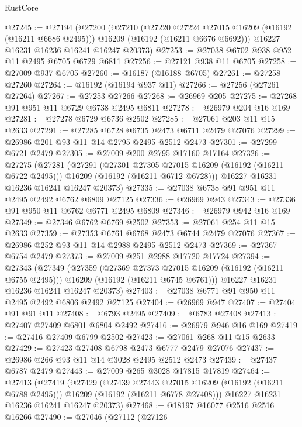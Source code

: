 \begin{lexlean}{RustCore}
\begin{coremodule}
@27245 := @27194
    (@27200
      (@27210
        (@27220 @27224 @27015 @16209 (@16192 (@16211 @6686 @2495)))
        @16209
        (@16192 (@16211 @6676 @6692)))
      @16227
      @16231
      @16236
      @16241
      @16247
      @20373)
@27253 := @27038 @6702 @938 @952 @11 @2495 @6705 @6729 @6811
@27256 := @27121 @938 @11 @6705
@27258 := @27009 @937 @6705
@27260 := @16187 (@16188 @6705)
@27261 := @27258 @27260
@27264 := @16192 (@16194 @937 @11)
@27266 := @27256 (@27261 @27264)
@27267 := @27253 @27266
@27268 := @26969 @205
@27275 := @27268 @91 @951 @11 @6729 @6738 @2495 @6811
@27278 := @26979 @204 @16 @169
@27281 := @27278 @6729 @6736 @2502
@27285 := @27061 @203 @11 @15 @2633
@27291 := @27285 @6728 @6735 @2473 @6711 @2479 @27076
@27299 := @26986 @201 @93 @11 @14 @2795 @2495 @2512 @2473
@27301 := @27299 @6721 @2479
@27305 := @27009 @200 @2795 @17160 @17164
@27326 := @27275
    (@27281
      (@27291
        (@27301 @27305 @27015 @16209 (@16192 (@16211 @6722 @2495)))
        @16209
        (@16192 (@16211 @6712 @6728)))
      @16227
      @16231
      @16236
      @16241
      @16247
      @20373)
@27335 := @27038 @6738 @91 @951 @11 @2495 @2492 @6762 @6809 @27125
@27336 := @26969 @943
@27343 := @27336 @91 @950 @11 @6762 @6771 @2495 @6809
@27346 := @26979 @942 @16 @169
@27349 := @27346 @6762 @6769 @2502
@27353 := @27061 @254 @11 @15 @2633
@27359 := @27353 @6761 @6768 @2473 @6744 @2479 @27076
@27367 := @26986 @252 @93 @11 @14 @2988 @2495 @2512 @2473
@27369 := @27367 @6754 @2479
@27373 := @27009 @251 @2988 @17720 @17724
@27394 := @27343
    (@27349
      (@27359
        (@27369 @27373 @27015 @16209 (@16192 (@16211 @6755 @2495)))
        @16209
        (@16192 (@16211 @6745 @6761)))
      @16227
      @16231
      @16236
      @16241
      @16247
      @20373)
@27403 := @27038 @6771 @91 @950 @11 @2495 @2492 @6806 @2492 @27125
@27404 := @26969 @947
@27407 := @27404 @91 @91 @11
@27408 := @6793 @2495
@27409 := @6783 @27408
@27413 := @27407 @27409 @6801 @6804 @2492
@27416 := @26979 @946 @16 @169
@27419 := @27416 @27409 @6799 @2502
@27423 := @27061 @268 @11 @15 @2633
@27429 := @27423 @27408 @6798 @2473 @6777 @2479 @27076
@27437 := @26986 @266 @93 @11 @14 @3028 @2495 @2512 @2473
@27439 := @27437 @6787 @2479
@27443 := @27009 @265 @3028 @17815 @17819
@27464 := @27413
    (@27419
      (@27429
        (@27439 @27443 @27015 @16209 (@16192 (@16211 @6788 @2495)))
        @16209
        (@16192 (@16211 @6778 @27408)))
      @16227
      @16231
      @16236
      @16241
      @16247
      @20373)
@27468 := @18197 @16077 @2516 @2516 @16266
@27490 := @27046
    (@27112
      (@27126

\end{coremodule}
\end{lexlean}
